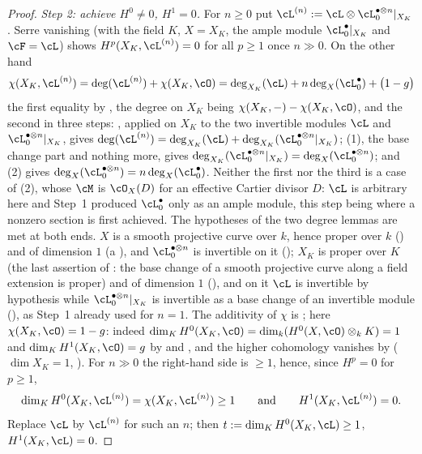\begin{proof}
\emph{Step 2: achieve $H^0\neq0$, $H^1=0$.}  For $n\ge0$ put
$\cL^{(n)}:=\cL\otimes\cL_0^{\bullet\otimes n}|_{X_K}$.  Serre vanishing
 (with the field $K$, $X=X_K$, the ample module
$\cL_0^{\bullet}|_{X_K}$ and $\cF=\cL$) shows
$H^p(X_K,\cL^{(n)})=0$ for all $p\ge1$ once $n\gg0$.  On the other hand
\[
\chi(X_K,\cL^{(n)})=\deg(\cL^{(n)})+\chi(X_K,\cO)
=\deg_{X_K}(\cL)+n\deg_X(\cL_0^{\bullet})+\bigl(1-g\bigr)
\]
the first equality by , the degree on
$X_K$ being $\chi(X_K,-)-\chi(X_K,\cO)$, and the second in three steps:
, applied on $X_K$ to the two
invertible modules $\cL$ and $\cL_0^{\bullet\otimes n}|_{X_K}$, gives
$\deg(\cL^{(n)})
=\deg_{X_K}(\cL)+\deg_{X_K}(\cL_0^{\bullet\otimes n}|_{X_K})$;
(1), the base change part and nothing
more, gives
$\deg_{X_K}(\cL_0^{\bullet\otimes n}|_{X_K})=\deg_X(\cL_0^{\bullet\otimes n})$;
and (2) gives
$\deg_X(\cL_0^{\bullet\otimes n})=n\deg_X(\cL_0^{\bullet})$.  Neither
the first nor the third is a case of (2),
whose $\cM$ is $\cO_X(D)$ for an effective Cartier divisor $D$: $\cL$ is
arbitrary here and Step~1 produced $\cL_0^{\bullet}$ only as an ample
module, this step being where a nonzero section is first achieved.  The
hypotheses of the two degree lemmas are met at both ends.  $X$ is a
smooth projective curve over $k$, hence proper over $k$
() and of dimension $1$ (a
), and $\cL_0^{\bullet\otimes n}$ is
invertible on it (); $X_K$ is proper
over $K$ (the last assertion of : the base
change of a smooth projective curve along a field extension is proper)
and of dimension $1$ (), and on it $\cL$ is
invertible by hypothesis while $\cL_0^{\bullet\otimes n}|_{X_K}$ is
invertible as a base change of an invertible module
(), as Step~1 already used for $n=1$.  The
additivity of $\chi$ is ; here
$\chi(X_K,\cO)=1-g$: indeed
$\dim_KH^0(X_K,\cO)=\dim_k(H^0(X,\cO)\otimes_kK)=1$ and
$\dim_KH^1(X_K,\cO)=g$ by  and
, and the higher cohomology vanishes by
 ($\dim X_K=1$,
).  For $n\gg0$ the right-hand side is
$\ge1$, hence, since $H^p=0$ for $p\ge1$,
\[
\dim_KH^0(X_K,\cL^{(n)})=\chi(X_K,\cL^{(n)})\geq1 \qquad\text{and}\qquad
H^1(X_K,\cL^{(n)})=0 .
\]
Replace $\cL$ by $\cL^{(n)}$ for such an $n$; then
$t:=\dim_KH^0(X_K,\cL)\geq1$, $H^1(X_K,\cL)=0$.


\end{proof}
